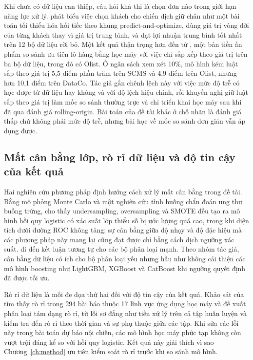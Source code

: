 Khi chưa có dữ liệu can thiệp, câu hỏi khả thi là chọn đơn nào trong giới hạn năng lực xử lý. \textcite{gomezvargas2025} phát biểu việc chọn khách cho chiến dịch giữ chân như một bài toán tối thiểu hóa hối tiếc theo khung predict-and-optimize, dùng giá trị vòng đời của từng khách thay vì giá trị trung bình, và đạt lợi nhuận trung bình tốt nhất trên 12 bộ dữ liệu rời bỏ. Một kết quả thận trọng hơn đến từ \textcite{li2026valuesorting}, một bản tiền ấn phẩm so sánh ưu tiên lô hàng bằng học máy với việc chỉ sắp xếp theo giá trị trên ba bộ dữ liệu, trong đó có Olist. Ở ngân sách xem xét 10\%, mô hình kém luật sắp theo giá trị 5,5 điểm phần trăm trên SCMS và 4,9 điểm trên Olist, nhưng hơn 10,1 điểm trên DataCo. Tác giả gắn chênh lệch này với việc mức độ trễ có học được từ dữ liệu hay không và với độ lệch hiệu chỉnh, rồi khuyến nghị giữ luật sắp theo giá trị làm mốc so sánh thường trực và chỉ triển khai học máy sau khi đã qua đánh giá rolling-origin. Bài toán của đề tài khác ở chỗ nhãn là đánh giá thấp chứ không phải mức độ trễ, nhưng bài học về mốc so sánh đơn giản vẫn áp dụng được.

\subsection{Mất cân bằng lớp, rò rỉ dữ liệu và độ tin cậy của kết quả}\label{sec:rel-imbalance}

Hai nghiên cứu phương pháp định hướng cách xử lý mất cân bằng trong đề tài. Bằng mô phỏng Monte Carlo và một nghiên cứu tình huống chẩn đoán ung thư buồng trứng, \textcite{vandengoorbergh2022} cho thấy undersampling, oversampling và SMOTE đều tạo ra mô hình hồi quy logistic có xác suất lớp thiểu số bị ước lượng quá cao, trong khi diện tích dưới đường ROC không tăng; sự cân bằng giữa độ nhạy và độ đặc hiệu mà các phương pháp này mang lại cũng đạt được chỉ bằng cách dịch ngưỡng xác suất. \textcite{elor2022smote} đi đến kết luận tương tự cho các bộ phân loại mạnh. Theo nhóm tác giả, cân bằng dữ liệu có ích cho bộ phân loại yếu nhưng hầu như không cải thiện các mô hình boosting như LightGBM, XGBoost và CatBoost khi ngưỡng quyết định đã được tối ưu.

Rò rỉ dữ liệu là mối đe dọa thứ hai đối với độ tin cậy của kết quả. Khảo sát của \textcite{kapoor2023} tìm thấy rò rỉ trong 294 bài báo thuộc 17 lĩnh vực ứng dụng học máy và đề xuất phân loại tám dạng rò rỉ, từ lỗi sơ đẳng như tiền xử lý trên cả tập huấn luyện và kiểm tra đến rò rỉ theo thời gian và sự phụ thuộc giữa các tập. Khi sửa các lỗi này trong bài toán dự báo nội chiến, các mô hình học máy phức tạp không còn vượt trội đáng kể so với hồi quy logistic. Kết quả này giải thích vì sao Chương~\ref{ch:method} ưu tiên kiểm soát rò rỉ trước khi so sánh mô hình.

